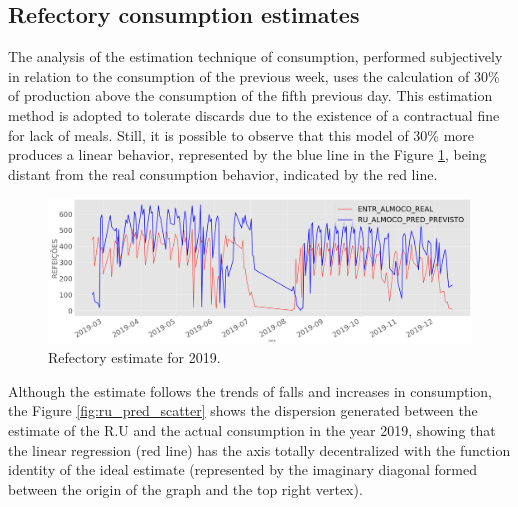     \subsection{Refectory consumption estimates}
    
        The analysis of the estimation technique of consumption, performed subjectively in relation to the consumption of the previous week, uses the calculation of  30\% of production above the consumption of the fifth previous day. This estimation method is adopted to tolerate discards due to the existence of a contractual fine for lack of meals. Still, it is possible to observe that this model of  30\% more produces a linear behavior, represented by the blue line in the Figure  \ref{fig:ru_pred},  being distant from the real consumption behavior, indicated by the red line. 

        \begin{figure}[!htbp]                \includegraphics[width=\textwidth]{./Figuras/resultados/case1_ru_pred.png}
                \caption{Refectory estimate for 2019.} \label{fig:ru_pred} 
        \end{figure}

            
        
        Although the estimate follows the trends of falls and increases in consumption, the Figure \ref{fig:ru_pred_scatter} shows the dispersion generated between the estimate of the R.U and the actual consumption in the year 2019, showing that the linear regression (red line) has the axis totally decentralized with the function identity of the ideal estimate (represented by the imaginary diagonal formed between the origin of the graph and the top right vertex). 
        

                \begin{figure}[ht]
                \end{figure} 

